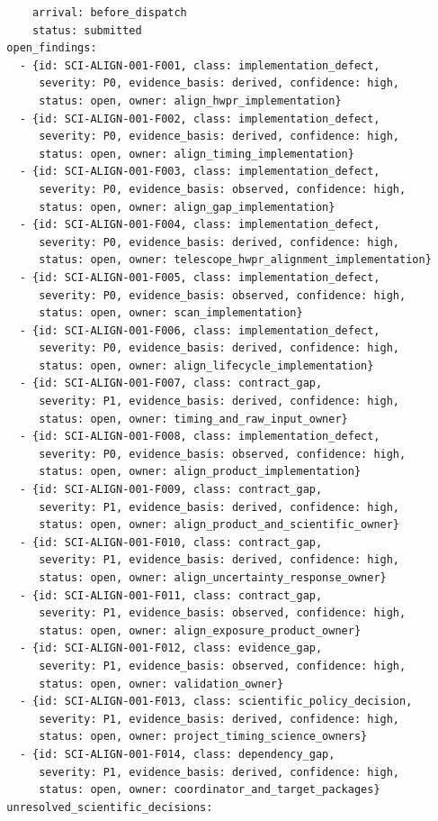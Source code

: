 \documentclass[11pt]{article}
\begin{document}
\begin{verbatim}
      arrival: before_dispatch
      status: submitted
  open_findings:
    - {id: SCI-ALIGN-001-F001, class: implementation_defect,
       severity: P0, evidence_basis: derived, confidence: high,
       status: open, owner: align_hwpr_implementation}
    - {id: SCI-ALIGN-001-F002, class: implementation_defect,
       severity: P0, evidence_basis: derived, confidence: high,
       status: open, owner: align_timing_implementation}
    - {id: SCI-ALIGN-001-F003, class: implementation_defect,
       severity: P0, evidence_basis: observed, confidence: high,
       status: open, owner: align_gap_implementation}
    - {id: SCI-ALIGN-001-F004, class: implementation_defect,
       severity: P0, evidence_basis: derived, confidence: high,
       status: open, owner: telescope_hwpr_alignment_implementation}
    - {id: SCI-ALIGN-001-F005, class: implementation_defect,
       severity: P0, evidence_basis: observed, confidence: high,
       status: open, owner: scan_implementation}
    - {id: SCI-ALIGN-001-F006, class: implementation_defect,
       severity: P0, evidence_basis: derived, confidence: high,
       status: open, owner: align_lifecycle_implementation}
    - {id: SCI-ALIGN-001-F007, class: contract_gap,
       severity: P1, evidence_basis: derived, confidence: high,
       status: open, owner: timing_and_raw_input_owner}
    - {id: SCI-ALIGN-001-F008, class: implementation_defect,
       severity: P0, evidence_basis: observed, confidence: high,
       status: open, owner: align_product_implementation}
    - {id: SCI-ALIGN-001-F009, class: contract_gap,
       severity: P1, evidence_basis: derived, confidence: high,
       status: open, owner: align_product_and_scientific_owner}
    - {id: SCI-ALIGN-001-F010, class: contract_gap,
       severity: P1, evidence_basis: derived, confidence: high,
       status: open, owner: align_uncertainty_response_owner}
    - {id: SCI-ALIGN-001-F011, class: contract_gap,
       severity: P1, evidence_basis: observed, confidence: high,
       status: open, owner: align_exposure_product_owner}
    - {id: SCI-ALIGN-001-F012, class: evidence_gap,
       severity: P1, evidence_basis: observed, confidence: high,
       status: open, owner: validation_owner}
    - {id: SCI-ALIGN-001-F013, class: scientific_policy_decision,
       severity: P1, evidence_basis: derived, confidence: high,
       status: open, owner: project_timing_science_owners}
    - {id: SCI-ALIGN-001-F014, class: dependency_gap,
       severity: P1, evidence_basis: derived, confidence: high,
       status: open, owner: coordinator_and_target_packages}
  unresolved_scientific_decisions:

\end{verbatim}
\end{document}
